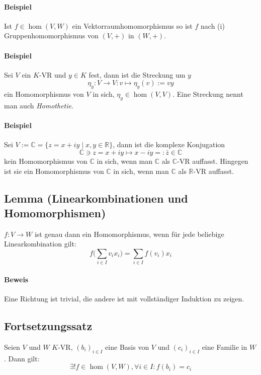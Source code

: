 \paragraph{Beispiel}
	Ist $f\in \hom(V,W)$ ein Vektorraumhomomorphismus so ist $ f $ nach (i) Gruppenhomomorphismus von $ (V,+) $ in $ (W,+) $.
  
\paragraph{Beispiel}
	Sei $ V $ ein $ K $-VR und $y\in K$ fest, dann ist die Streckung um $y$
	\[\eta_y:V\to V: v\mapsto \eta_y(v) := vy\]
	ein Homomorphismus von $ V $ in sich, $\eta_y\in \hom(V,V)$. Eine Streckung nennt man auch \emph{Homothetie}.
  	
\paragraph{Beispiel}
	Sei $V := \mathbb{C} = \{z = x+iy\mid x,y\in \mathbb{R}\}$, dann ist die komplexe Konjugation
	\[\mathbb{C}\ni z = x+iy \mapsto x-iy =: \bar{z} \in \mathbb{C}\]
	kein Homomorphismus von $\mathbb{C}$ in sich, wenn man $\mathbb{C}$ als $\mathbb{C}$-VR auffasst. Hingegen ist sie ein Homomorphismus von $\mathbb{C}$ in sich, wenn man $\mathbb{C}$ als $ \mathbb{R} $-VR auffasst.
	
\subsection{Lemma (Linearkombinationen und Homomorphismen)}
	\begin{Lemma}
		$f:V\to W$ ist genau dann ein Homomorphismus, wenn für jede beliebige Linearkombination gilt:
		\begin{equation*}
                    f\Big(\sum_{i\in I}v_ix_i\Big) = \sum_{i\in I}f(v_i)x_i
		\end{equation*}
	\end{Lemma}

\paragraph{Beweis}
	Eine Richtung ist trivial, die andere ist mit vollständiger Induktion zu zeigen.

\subsection{Fortsetzungssatz} 
	\begin{Satz}[Fortsetzungssatz]
		Seien $ V $ und $ W $ $K$-VR, $(b_i)_{i\in I}$ eine Basis von $ V $ und $(c_i)_{i\in I}$ eine Familie in $ W $.
	Dann gilt:
	\begin{equation*}
            \exists!f\in \hom(V,W), \forall i\in I: f(b_i) = c_i
        \end{equation*}
	\end{Satz}
    
